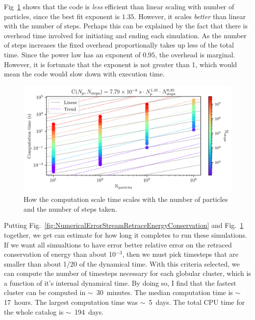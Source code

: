         Fig~\ref{fig:NumericalErrorComputationTimeScalingForStreams} shows that the code is \textit{less} efficient than linear scaling with number of particles, since the best fit exponent is $1.35$. However, it scales \textit{better} than linear with the number of steps. Perhaps this can be explained by the fact that there is overhead time involved for initiating and ending each simulation. As the number of steps increases the fixed overhead proportionally takes up less of the total time. Since the power law has an exponent of $0.95$, the overhead is marginal. However, it is fortunate that the exponent is not greater than 1, which would mean the code would slow down with execution time. 
        \begin{figure}
            \centering
            \includegraphics[width=\linewidth]{images/NumericalErrorComputationTimeScalingForStreams.png}
            \caption[Profiling \texttt{tstrippy}'s computation time for the number of particles and time steps]{How the computation scale time scales with the number of particles and the number of steps taken.}
            \label{fig:NumericalErrorComputationTimeScalingForStreams}
        \end{figure}
        Putting Fig.~\ref{fig:NumericalErrorStreamRetraceEnergyConservation} and Fig.~\ref{fig:NumericalErrorComputationTimeScalingForStreams} together, we get can estimate for how long it completes to run these simulations. If we want all simualtions to have error better relative error on the retraced conservation of energy than about 10$^{-3}$, then we must pick timesteps that are smaller than about 1/20 of the dynamical time. With this criteria selected, we can compute the number of timesteps necessary for each globular cluster, which is a function of it's internal dynamical time. By doing so, I find that the fastest cluster can be computed in $\sim$~30~minutes. The median computation time is $\sim$17~hours. The largest computation time was $\sim$~5~days. The total CPU time for the whole catalog is $\sim$~194~days. 

